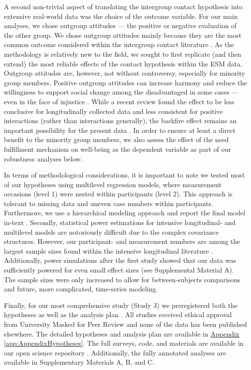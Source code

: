 \documentclass[man, 12pt, a4paper, mask]{apa7}
\theoremstyle{break}
\theoremstyle{plain}
\newcommand{\appref}[2][]{\hyperref[#2]{Appendix \ref*{#2}#1}}
\begin{document}
A second non-trivial aspect of translating the intergroup contact hypothesis into extensive real-world data was the choice of the outcome variable. For our main analyses, we chose outgroup attitudes --- the positive or negative evaluation of the other group. We chose outgroup attitudes mainly because they are the most common outcome considered within the intergroup contact literature \citep[e.g.,][]{Pettigrew2006, Paolini2021}. As the methodology is relatively new to the field, we sought to first replicate (and then extend) the most reliable effects of the contact hypothesis within the ESM data. Outgroup attitudes are, however, not without controversy, especially for minority group members. Positive outgroup attitudes can increase harmony and reduce the willingness to support social change among the disadvantaged in some cases --- even in the face of injustice \citep[e.g.,][]{dixon2012, saguy2009}. While a recent review found the effect to be less conclusive for longitudinally collected data and less consistent for positive interactions (rather than interactions generally), the backfire effect remains an important possibility for the present data \citep[see][]{reimer2023}. In order to ensure at least a direct benefit to the minority group members, we also assess the effect of the need fulfillment mechanism on well-being as the dependent variable as part of our robustness analyses below.

In terms of methodological considerations, it is important to note we tested most of our hypotheses using multilevel regression models, where measurement occasions (level 1) were nested within participants (level 2). This approach is tolerant to missing data and uneven case numbers within participants. Furthermore, we use a hierarchical modeling approach and report the final model in-text \citep[][; for the full modeling process see Supplementary Material A]{snijders2012}. Secondly, statistical power estimations for intensive longitudinal- and multilevel models are notoriously difficult due to the complex covariance structures. However, our participant- and measurement numbers are among the largest sample sizes found within the intensive longitudinal literature \citep[e.g.,][]{AanhetRot2012}. Additionally, power simulations after the first study showed that our data was sufficiently powered for even small effect sizes (see Supplemental Material A). The sample sizes were only increased to allow for between-subjects comparisons and future, more complicated, time-series modeling.

Finally, for our most comprehensive study (Study 3) we preregistered both the hypotheses as well as the analysis plan \citep[available at][]{KreienkampMasked2021f}. All studies received ethical approval from University Masked for Peer Review and none of the data has been published elsewhere. The detailed hypotheses and analysis plan are available in \appref{app:AppendixHypotheses}. The full surveys, code, and materials are available in our open science repository \citep[including a complete codebook;][]{KreienkampMasked2022a}. Additionally, the fully annotated analyses are available in Supplementary Materials A, B, and C.
\end{document}
